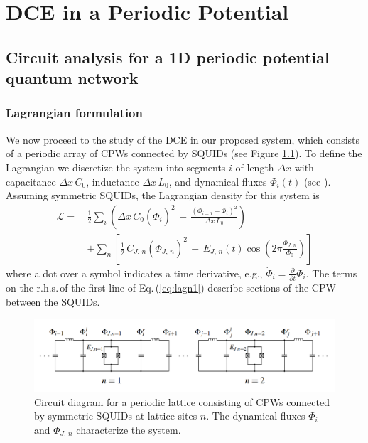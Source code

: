  \chapter{DCE in a Periodic Potential} \label{ch:system}


\section{Circuit analysis for a 1D periodic potential quantum network}\label{sec:circ_an}


\subsection{Lagrangian formulation}
\noindent
We now proceed to the study of the DCE in our proposed system, which consists of a periodic array of CPWs connected by SQUIDs (see Figure \ref{fig:circuit_diagram}). To define the Lagrangian we discretize the system into 
segments $i$ of length $\Delta x$ with capacitance $\Delta x \, C_0$, inductance $\Delta x \, L_0$, and dynamical fluxes $\Phi_i(t)$ 
(see \cite{Vool2017}).
Assuming symmetric SQUIDs, the Lagrangian density for this system is 
%
\begin{equation} \label{eq:lagn1}
\begin{split}
\mathcal{L} = \, & \frac{1}{2} \sum_i \left( \Delta x \, C_{0} \left(\dot{\Phi}_{i}\right)^{2} \, - \, 
\frac{\left(\Phi_{i+1}-\Phi_{i}\right)^{2}}{\Delta x \, L_{0}} \right)  \\[2mm]
& + \sum_n \left[ \frac{1}{2} \, C_{J,\,n} \left(\dot{\Phi}_{J,\,n} \right)^{2} \, + \, 
E_{J,\,n}(t) \cos\left(2\pi \frac{\Phi_{J,\,n}}{\Phi_0} \right) \right]
\end{split}
\end{equation}
where a dot over a symbol indicates a time derivative, e.g., 
$\displaystyle \dot{\Phi}_i = \frac{\partial}{\partial t} \Phi_i$.
The terms on the r.h.s.\,of the first line of Eq.\,(\ref{eq:lagn1}) describe sections of the CPW between the SQUIDs. %
%
\begin{figure}
    \centering
    \includegraphics[width=\textwidth, keepaspectratio]{figures/system/circuit_diagram.png}
    \caption{Circuit diagram for a periodic lattice consisting of CPWs connected by symmetric SQUIDs at lattice sites $n$. 
    The dynamical fluxes $\Phi_i$ and $\Phi_{J,\,n}$ characterize the system.}
    \label{fig:circuit_diagram}
\end{figure}

